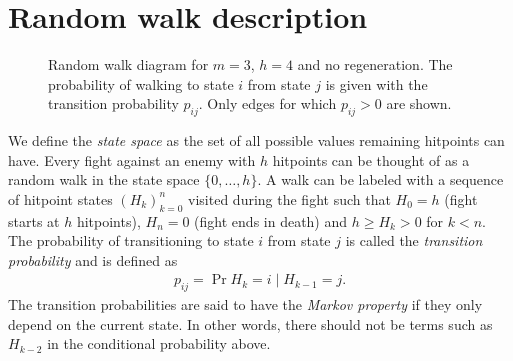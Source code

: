 \section{Random walk description}\label{chap:fightDef}
\begin{figure}\label{fig:randomWalk}
    \centering
    \caption{Random walk diagram for $m=3$, $h=4$ and no regeneration. The probability of walking to state $i$ from state $j$ is given with the transition probability $p_{ij}$. Only edges for which $p_{ij} > 0$ are shown.}
\end{figure}

We define the \textit{state space} as the set of all possible values remaining hitpoints can have. Every fight against an enemy with $h$ hitpoints can be thought of as a random walk in the state space $\{0,\ldots,h\}$. A walk can be labeled with a sequence of hitpoint states $(H_k)_{k=0}^{n}$ visited during the fight such that $H_0=h$ (fight starts at $h$ hitpoints), $H_n=0$ (fight ends in death) and $h \geq H_k > 0$ for $k<n$.
The probability of transitioning to state $i$ from state $j$ is called the \textit{transition probability} and is defined as
\begin{align}\label{eq:transitionProbabilities}
    p_{ij} = \Pr{H_k = i \mid H_{k-1} = j}.
\end{align}
The transition probabilities are said to have the \textit{Markov property} if they only depend on the current state. In other words, there should not be terms such as $H_{k-2}$ in the conditional probability above.

